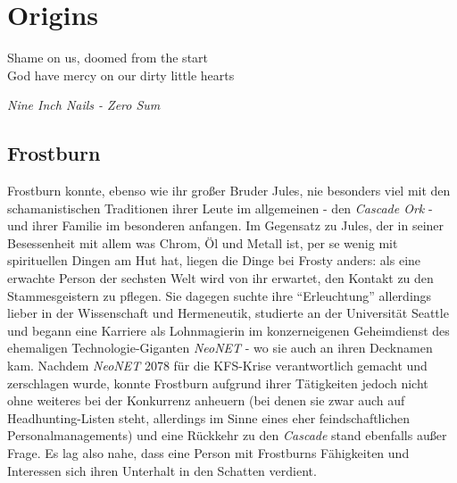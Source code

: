 \chapter{Origins}

\epigraph{Shame on us, doomed from the start\\God have mercy on our dirty little hearts}{\textit{Nine Inch Nails - Zero Sum}}

\section{Frostburn}
Frostburn konnte, ebenso wie ihr großer Bruder Jules, nie besonders viel mit den schamanistischen Traditionen ihrer Leute im allgemeinen - den \textit{Cascade Ork} - und ihrer Familie im besonderen anfangen. Im Gegensatz zu Jules, der in seiner Besessenheit mit allem was Chrom, Öl und Metall ist, per se wenig mit spirituellen Dingen am Hut hat, liegen die Dinge bei Frosty anders: als eine erwachte Person der sechsten Welt wird von ihr erwartet, den Kontakt zu den Stammesgeistern zu pflegen. Sie dagegen suchte ihre ``Erleuchtung'' allerdings lieber in der Wissenschaft und Hermeneutik, studierte an der Universität Seattle und begann eine Karriere als Lohnmagierin im konzerneigenen Geheimdienst des ehemaligen Technologie-Giganten \textit{NeoNET} - wo sie auch an ihren Decknamen kam. Nachdem \textit{NeoNET} 2078 für die KFS-Krise verantwortlich gemacht und zerschlagen wurde, konnte Frostburn aufgrund ihrer Tätigkeiten jedoch nicht ohne weiteres bei der Konkurrenz anheuern (bei denen sie zwar auch auf Headhunting-Listen steht, allerdings im Sinne eines eher feindschaftlichen Personalmanagements) und eine Rückkehr zu den \textit{Cascade} stand ebenfalls außer Frage. Es lag also nahe, dass eine Person mit Frostburns Fähigkeiten und Interessen sich ihren Unterhalt in den Schatten verdient.



